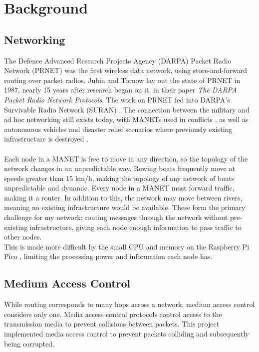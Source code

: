 \documentclass[12pt,a4paper]{report}
\begin{document}
\section{Background}
\subsection{Networking}
The Defence Advanced Research Projects Agency (DARPA) Packet Radio Network (PRNET) \cite{prnet} was the first wireless data network, using store-and-forward routing over packet radios. Jubin and Tornow lay out the state of PRNET in 1987, nearly 15 years after research began on it, in their paper \emph{The DARPA Packet Radio Network Protocols}. The work on PRNET fed into DARPA's Survivable Radio Network (SURAN) \cite{suran}. The connection between the military and ad hoc networking still exists today, with MANETs used in conflicts \cite{military}, as well as autonomous vehicles \cite{vehicle} and disaster relief scenarios where previously existing infrastructure is destroyed \cite{disaster}. \\ \\
Each node in a MANET is free to move  in any direction, so the topology of the network changes in an unpredictable way. Rowing boats frequently move at speeds greater than 15 km/h, making the topology of any network of boats unpredictable and dynamic. Every node in a MANET must forward traffic, making it a router. In addition to this, the network may move between rivers, meaning no existing infrastructure would be available. These form the primary challenge for my network; routing messages through the network without pre-existing infrastructure, giving each node enough information to pass traffic to other nodes. \\
This is made more difficult by the small CPU and memory on the Raspberry Pi Pico \cite{rp2040}, limiting the processing power and information each node has.  \\
\subsection{Medium Access Control}
While routing corresponds to many hops across a network, medium access control considers only one. Media access control protocols control access to the transmission media to prevent collisions between packets. This project implemented media access control to prevent packets colliding and subsequently being corrupted. \\
\end{document}
